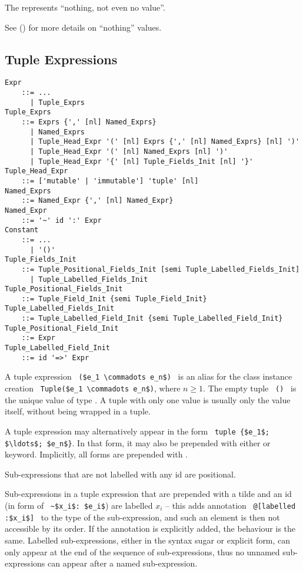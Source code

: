 The  represents ``nothing, not even no value''.

See () for more details on ``nothing'' values. 





\subsection{Tuple Expressions}
\label{sec:tuples}

\grammar\begin{lstlisting}
Expr
    ::= ...
      | Tuple_Exprs
Tuple_Exprs 
    ::= Exprs {',' [nl] Named_Exprs}
      | Named_Exprs
      | Tuple_Head_Expr '(' [nl] Exprs {',' [nl] Named_Exprs} [nl] ')'
      | Tuple_Head_Expr '(' [nl] Named_Exprs [nl] ')'
      | Tuple_Head_Expr '{' [nl] Tuple_Fields_Init [nl] '}'
Tuple_Head_Expr
    ::= ['mutable' | 'immutable'] 'tuple' [nl]
Named_Exprs 
    ::= Named_Expr {',' [nl] Named_Expr}
Named_Expr
    ::= '~' id ':' Expr
Constant 
    ::= ...
      | '()'
Tuple_Fields_Init 
    ::= Tuple_Positional_Fields_Init [semi Tuple_Labelled_Fields_Init]
      | Tuple_Labelled_Fields_Init
Tuple_Positional_Fields_Init
    ::= Tuple_Field_Init {semi Tuple_Field_Init}
Tuple_Labelled_Fields_Init
    ::= Tuple_Labelled_Field_Init {semi Tuple_Labelled_Field_Init}
Tuple_Positional_Field_Init 
    ::= Expr
Tuple_Labelled_Field_Init
    ::= id '=>' Expr
\end{lstlisting}

A tuple expression ~\lstinline!($e_1 \commadots e_n$)!~ is an alias for the class instance creation ~\lstinline!Tuple($e_1 \commadots e_n$)!, where $n \geq 1$. The empty tuple ~\lstinline!()!~ is the unique value of type . A tuple with only one value is usually only the value itself, without being wrapped in a tuple.  

A tuple expression may alternatively appear in the form ~\lstinline!tuple {$e_1$; $\ldots$; $e_n$}!. In that form, it may also be prepended with either  or  keyword. Implicitly, all forms are prepended with . 

Sub-expressions that are not labelled with any id are positional. 

Sub-expressions in a tuple expression that are prepended with a tilde and an id (in form of ~\lstinline!~$x_i$: $e_i$!) are labelled $x_i$ -- this adds annotation ~\lstinline!@[labelled :$x_i$]!~ to the type of the sub-expression, and such an element is then not accessible by its order. If the annotation is explicitly added, the behaviour is the same. Labelled sub-expressions, either in the syntax sugar or explicit form, can only appear at the end of the sequence of sub-expressions, thus no unnamed sub-expressions can appear after a named sub-expression. 

